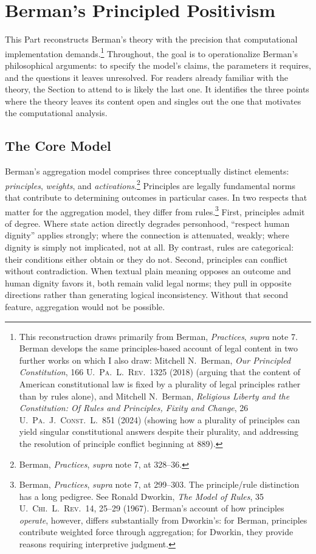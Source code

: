 \section{Berman's Principled Positivism}

This Part reconstructs Berman's theory with the precision that
computational implementation demands.\footnote{This reconstruction draws
primarily from Berman, \textit{Practices}, \textit{supra} note 7.
Berman develops the same principles-based account of legal content in two
further works on which I also draw: Mitchell N.\ Berman, \textit{Our
Principled Constitution}, 166 \textsc{U.\ Pa.\ L.\ Rev.}\ 1325 (2018)
(arguing that the content of American constitutional law is fixed by a
plurality of legal principles rather than by rules alone), and Mitchell
N.\ Berman, \textit{Religious Liberty and the Constitution: Of Rules and
Principles, Fixity and Change}, 26 \textsc{U.\ Pa.\ J.\ Const.\ L.}\ 851
(2024) (showing how a plurality of principles can yield singular
constitutional answers despite their plurality, and addressing the
resolution of principle conflict beginning at 889).} Throughout, the goal is to operationalize Berman's philosophical arguments:
to specify the model's claims, the parameters it requires, and the
questions it leaves unresolved. For readers already familiar with the
theory, the Section to attend to is likely the last one. It identifies the
three points where the theory leaves its content open and singles out the
one that motivates the computational analysis.

\subsection{The Core Model}

Berman's aggregation model comprises three conceptually distinct
elements: \textit{principles}, \textit{weights}, and
\textit{activations}.\footnote{Berman, \textit{Practices}, \textit{supra} note 7, at 328--36.} Principles are legally
fundamental norms that contribute to determining outcomes in particular
cases. In two respects that matter for the aggregation model, they differ from
rules.\footnote{Berman, \textit{Practices}, \textit{supra} note 7, at 299--303. The principle/rule distinction
has a long pedigree. See Ronald Dworkin, \textit{The Model of Rules}, 35
\textsc{U.\ Chi.\ L.\ Rev.}\ 14, 25--29 (1967). Berman's account of how
principles \textit{operate}, however, differs substantially from
Dworkin's: for Berman, principles contribute weighted force through
aggregation; for Dworkin, they provide reasons requiring interpretive
judgment.} First, principles admit of degree. Where state action directly degrades
personhood, ``respect human dignity'' applies strongly; where the
connection is attenuated, weakly; where dignity is simply not implicated,
not at all. By contrast, rules are categorical: their conditions either
obtain or they do not. Second, principles can conflict without
contradiction. When textual plain meaning opposes an outcome and human
dignity favors it, both remain valid legal norms; they pull in opposite
directions rather than generating logical inconsistency. Without that second feature, aggregation would not be possible.

